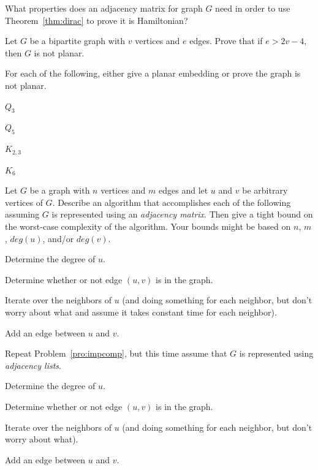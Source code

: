 \begin{pro}
What properties does an adjacency matrix for graph $G$ need in order to 
use Theorem~\ref{thm:dirac} to prove it is Hamiltonian?
\end{pro}

\begin{pro}
Let $G$ be a bipartite graph with $v$ vertices and $e$ edges.
Prove that if $e> 2v-4$, then $G$ is not planar.
\end{pro}

\begin{pro}
For each of the following, either give a planar embedding or prove the graph 
is not planar.
\begin{lenum}
\item $Q_3$
\item $Q_5$ 
\item $K_{2,3}$
\item $K_6$
\end{lenum}
\end{pro}


\begin{pro}\label{pro:impcomp}
Let $G$ be a graph with $n$ vertices and $m$ edges  
and let $u$ and $v$ be arbitrary vertices of $G$.
Describe an algorithm that accomplishes each of the following
assuming $G$ is represented using an {\em adjacency matrix}. 
Then give a tight bound on the worst-case complexity of the algorithm.
Your bounds might be based on $n$, $m$, $deg(u)$, and/or $deg(v)$.
\begin{lenum}
\item
Determine the degree of $u$.
\item
Determine whether or not edge $(u,v)$ is in the graph.
\item
Iterate over the neighbors of $u$ (and doing something for each neighbor,
but don't worry about what and assume it takes constant time for each neighbor).
\item
Add an edge between $u$ and $v$.
\end{lenum}
\end{pro}

\begin{pro}
Repeat Problem~\ref{pro:impcomp}, but this time assume that
$G$ is represented using {\em adjacency lists}. 
\begin{lenum}
\item
Determine the degree of $u$.
\item
Determine whether or not edge $(u,v)$ is in the graph.
\item
Iterate over the neighbors of $u$ (and doing something for each neighbor,
but don't worry about what).
\item
Add an edge between $u$ and $v$.
\end{lenum}
\end{pro}


